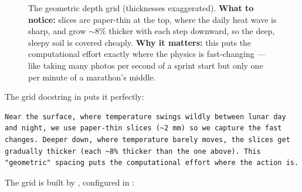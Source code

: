 \begin{figure}[h]
\centering
{}
\caption[The geometric depth grid]{The geometric depth grid (thicknesses
exaggerated). \textbf{What to notice:} slices are paper-thin at the top, where
the daily heat wave is sharp, and grow ${\sim}8\%$ thicker with each step
downward, so the deep, sleepy soil is covered cheaply. \textbf{Why it matters:}
this puts the computational effort exactly where the physics is fast-changing
--- like taking many photos per second of a sprint start but only one per minute
of a marathon's middle.}
\label{fig:grid}
\end{figure}

The grid docstring in  puts it perfectly:

\begin{lstlisting}[language={},style=shellstyle,caption={From the \file{lunar/grid.py} docstring.}]
Near the surface, where temperature swings wildly between lunar day
and night, we use paper-thin slices (~2 mm) so we capture the fast
changes. Deeper down, where temperature barely moves, the slices get
gradually thicker (each ~8% thicker than the one above). This
"geometric" spacing puts the computational effort where the action is.
\end{lstlisting}

The grid is built by , configured in
:

